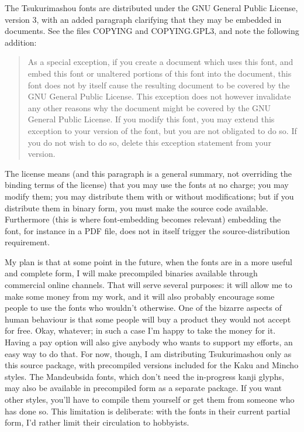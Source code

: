 \documentclass[14pt]{extarticle}
\begin{document}
The Tsukurimashou fonts are distributed under the GNU General Public
License, version 3, with an added paragraph clarifying that they may be
embedded in documents.  See the files COPYING and COPYING.GPL3, and
note the following addition:

\begin{quotation}
As a special exception, if you create a document which uses this font, and
embed this font or unaltered portions of this font into the document, this
font does not by itself cause the resulting document to be covered by the
GNU General Public License. This exception does not however invalidate any
other reasons why the document might be covered by the GNU General Public
License. If you modify this font, you may extend this exception to your
version of the font, but you are not obligated to do so. If you do not wish
to do so, delete this exception statement from your version.
\end{quotation}

The license means (and this paragraph is a general summary, not overriding
the binding terms of the license) that you may use the fonts at no charge;
you may modify them; you may distribute them with or without modifications;
but if you distribute them in binary form, you must make the source code
available.  Furthermore (this is where font-embedding becomes relevant)
embedding the font, for instance in a PDF file, does not in itself
trigger the source-distribution requirement.

My plan is that at some point in the future, when the fonts are in a more
useful and complete form, I will make precompiled binaries available through
commercial online channels.  That will serve several purposes: it will allow
me to make some money from my work, and it will also probably encourage some
people to use the fonts who wouldn't otherwise.  One of the bizarre aspects
of human behaviour is that some people will buy a product they would not
accept for free.  Okay, whatever; in such a case I'm happy to take the money
for it.  Having a pay option will also give anybody who wants to support my
efforts, an easy way to do that.  For now, though, I am distributing
Tsukurimashou only as this source package, with precompiled versions
included for the Kaku and Mincho styles.  The Mandeubsida fonts, which don't
need the in-progress kanji glyphs, may also be available in precompiled form
as a separate package.  If you want other styles, you'll have to compile
them yourself or get them from someone who has done so.  This limitation is
deliberate: with the fonts in their current partial form, I'd rather limit
their circulation to hobbyists.
\end{document}

